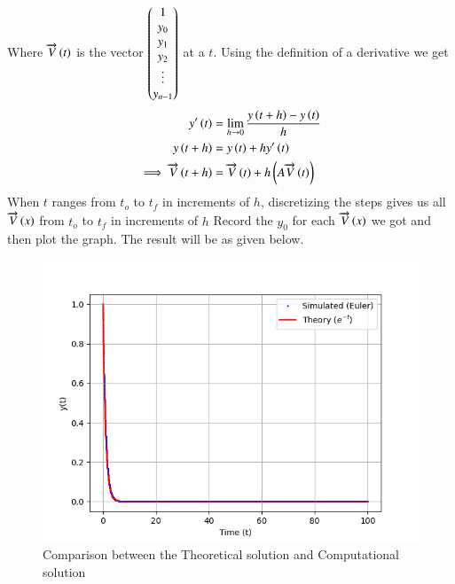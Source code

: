 \documentclass[journal]{IEEEtran}
\begin{document}
Where $\overrightarrow{V}\left(t\right)$ is the vector $\begin{pmatrix}1\\y_{0}\\y_{1}\\y_{2}\\ \vdots\\y_{n-1}\end{pmatrix}$ at a $t$. Using the definition of a derivative we get
\begin{align}
	y^{\prime}\left(t\right) &= \lim_{h\to 0}\frac{y\left(t+h\right) - y\left(t\right)}{h}\\
	y\left(t+h\right) &= y\left(t\right) + hy^{\prime}\left(t\right)\\
    \implies \overrightarrow{V}\left(t+h\right)&=\overrightarrow{V}\left(t\right)+h\left(A\overrightarrow{V}\left(t\right)\right)
\end{align}
When $t$ ranges from $t_o$ to $t_f$ in increments of $h$, discretizing the steps gives us all $\overrightarrow{V}\left(x\right)$ from $t_o$ to $t_f$ in increments of $h$
Record the $y_0$ for each $\overrightarrow{V}\left(x\right)$ we got and then plot the graph. The result will be as given below.
\begin{figure}[h!]
   \centering
   \includegraphics[width=1\linewidth]{figs/fig.png}
   \caption{Comparison between the Theoretical solution and Computational solution}
   \label{stemplot}
\end{figure}
\end{document}

